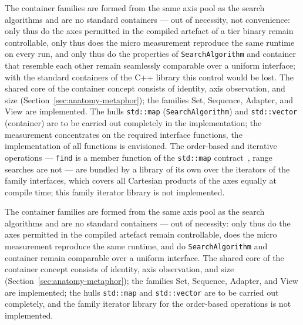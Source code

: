 \begin{nurlang}
The container families are formed from the same axis pool as the search algorithms and are no
standard containers --- out of necessity, not convenience: only thus do the axes permitted in the compiled artefact of a
tier binary remain controllable, only thus does the micro measurement reproduce the same runtime on every
run, and only thus do the properties of \texttt{SearchAlgorithm} and container that
resemble each other remain seamlessly comparable over a uniform interface; with the standard containers of the
C++ library this control would be lost. The shared core of the container concept consists of
identity, axis observation, and size (Section~\ref{sec:anatomy-metaphor}); the families Set, Sequence,
Adapter, and View are implemented. The hulls \texttt{std::map} (\texttt{SearchAlgorithm}) and
\texttt{std::vector} (container) are to be carried out completely in the implementation; the measurement
concentrates on the required interface functions, the implementation of all functions is
envisioned. The order-based and iterative operations --- \texttt{find} is a
member function of the \texttt{std::map} contract~\cite{iso_cpp}, range searches are not ---
are bundled by a library of its own over the iterators of the family interfaces, which covers all Cartesian products
of the axes equally at compile time; this family iterator library is not implemented.
\end{nurlang}
\begin{nurkurz}
The container families are formed from the same axis pool as the search algorithms and are no standard
containers --- out of necessity: only thus do the axes permitted in the compiled artefact remain
controllable, does the micro measurement reproduce the same runtime, and do \texttt{SearchAlgorithm} and
container remain comparable over a uniform interface. The shared core of the container concept consists of
identity, axis observation, and size (Section~\ref{sec:anatomy-metaphor}); the families Set, Sequence,
Adapter, and View are implemented; the hulls \texttt{std::map} and \texttt{std::vector} are to be carried
out completely, and the family iterator library for the order-based operations is not implemented.
\end{nurkurz}

